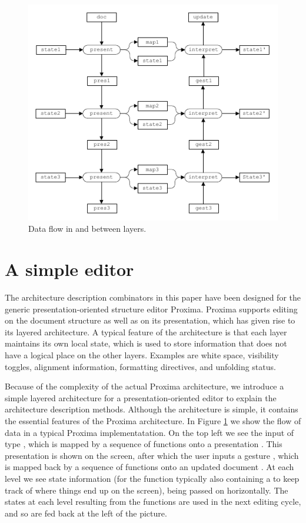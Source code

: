 \documentclass{llncs}
\begin{document}
\renewcommand{\textfraction}{1} 
\begin{figure}
\includegraphics[width=\columnwidth]{images/LayersDataFlow}
\caption{Data flow in and between layers.} \label{explicit} 
\end{figure}													\section{A simple editor}\label{sect:simpleEditor}

The architecture description combinators in this paper have been designed for the generic presentation-oriented structure editor Proxima. Proxima supports editing on the document structure as well as on its presentation, which has given rise to its layered architecture. A typical feature of the architecture is that each layer maintains its own local state, which is used to store information that does not have a logical place on the other layers. Examples are white space, visibility toggles, alignment information, formatting directives, and unfolding status. 

Because of the complexity of the actual Proxima architecture, we introduce a simple layered architecture for a presentation-oriented editor to explain the architecture description methods. Although the architecture is simple, it contains the essential features of the Proxima architecture. In Figure \ref{explicit} we show the flow of data in a typical Proxima implementatation. On the top left we see the input of type , which is mapped by a sequence of  functions onto a presentation . This presentation is shown on the screen, after which the user inputs a gesture , which is mapped back by a sequence of  functions onto an updated document . At each level we see state information (for the  function typically also containing a  to keep track of where things end up on the screen), being passed on horizontally. The states at each level resulting from the  functions are used in the next editing cycle, and so are fed back at the left of the picture.
	
\end{document}
